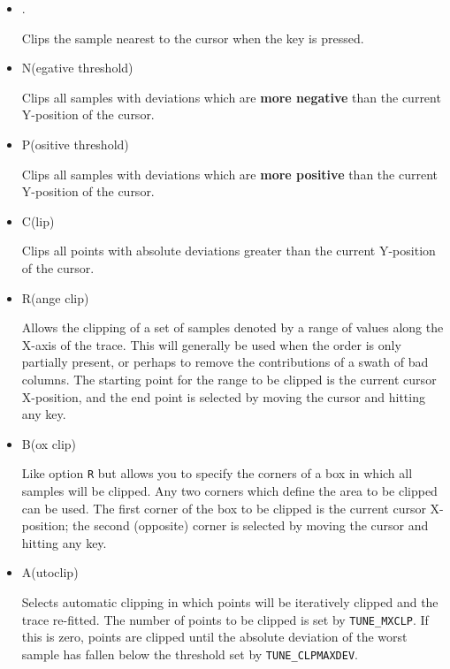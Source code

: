 \begin{itemize}

\item {\sunspec{\Large\tt}{\bf} .}

     Clips the sample nearest to the cursor when the key is pressed.

\item {\sunspec{\Large\tt}{\bf} N}(egative threshold)

     Clips all samples with deviations which are
     {\bf more negative} than the current Y-position of the cursor.

\item {\sunspec{\Large\tt}{\bf} P}(ositive threshold)

     Clips all samples with deviations which are
     {\bf more positive} than the current Y-position of the cursor.


\item {\sunspec{\Large\tt}{\bf} C}(lip)

     Clips all points with absolute deviations greater than the current
     Y-position of the cursor.

\item {\sunspec{\Large\tt}{\bf} R}(ange clip)

     Allows the clipping of a set of samples denoted by a range
     of values along the X-axis of the trace. This will generally be used
     when the order is only partially present, or perhaps to remove
     the contributions of a swath of bad columns. The starting point for
     the range to be clipped is the current cursor X-position, and the
     end point is selected by moving the cursor and hitting any key.

\item {\sunspec{\Large\tt}{\bf} B}(ox clip)

     Like option \verb+R+ but allows you to specify the corners of
     a box in which all samples will be clipped.  Any two corners
     which define the area to be clipped can be used.
     The first corner of the box to be clipped is the current
     cursor X-position; the second (opposite) corner
     is selected by moving the cursor and hitting any key.

\item {\sunspec{\Large\tt}{\bf} A}(utoclip)

     Selects automatic clipping in which points will be
     iteratively clipped and the trace re-fitted. The number of points
     to be clipped is set by {\tt TUNE\_MXCLP}.  If this is zero,
     points are clipped until the absolute deviation of the worst
     sample has fallen below the threshold set by {\tt TUNE\_CLPMAXDEV}.



\end{itemize}
